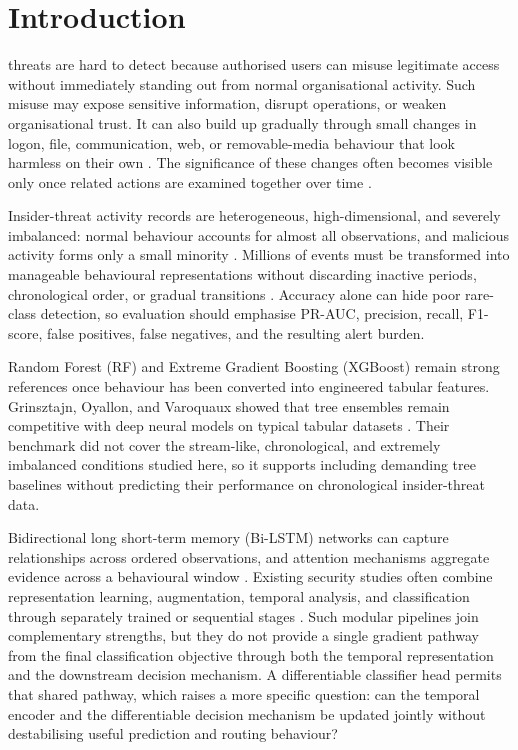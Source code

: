 \section{Introduction}
\label{sec:introduction}
 threats are hard to detect because authorised users
can misuse legitimate access without immediately standing out from normal
organisational activity. Such misuse may expose sensitive information,
disrupt operations, or weaken organisational trust. It can also build up
gradually through small changes in logon, file, communication, web, or
removable-media behaviour that look harmless on their own
\cite{AlzaabiMehmood2024,AlketbiMehmood2025}. The significance of these
changes often becomes visible only once related actions are examined
together over time \cite{Eshmawi2026,Pal2023}.

\smallskip
Insider-threat activity records are heterogeneous, high-dimensional, and
severely imbalanced: normal behaviour accounts for almost all observations,
and malicious activity forms only a small minority
\cite{AlShehariAlsowail2023,YuanWu2021}. Millions of events must be
transformed into manageable behavioural representations without discarding
inactive periods, chronological order, or gradual transitions
\cite{LeZincirHeywood2021,Alshehri2022,Xiao2024}. Accuracy alone can hide
poor rare-class detection, so evaluation should emphasise PR-AUC, precision,
recall, F1-score, false positives, false negatives, and the resulting alert
burden.

\smallskip
Random Forest (RF) and Extreme Gradient Boosting (XGBoost) remain strong
references once behaviour has been converted into engineered tabular
features. Grinsztajn, Oyallon, and Varoquaux showed that tree ensembles
remain competitive with deep neural models on typical tabular datasets
\cite{Grinsztajn2022}. Their benchmark did not cover the stream-like,
chronological, and extremely imbalanced conditions studied here, so it
supports including demanding tree baselines without predicting their
performance on chronological insider-threat data.

\smallskip
Bidirectional long short-term memory (Bi-LSTM) networks can capture
relationships across ordered observations, and attention mechanisms
aggregate evidence across a behavioural window \cite{YuanWu2021,Song2024}.
Existing security studies often combine representation learning,
augmentation, temporal analysis, and classification through separately
trained or sequential stages \cite{He2024,Gayathri2024}. Such modular
pipelines join complementary strengths, but they do not provide a single
gradient pathway from the final classification objective through both the
temporal representation and the downstream decision mechanism. A
differentiable classifier head permits that shared pathway, which raises a
more specific question: can the temporal encoder and the differentiable
decision mechanism be updated jointly without destabilising useful
prediction and routing behaviour?

